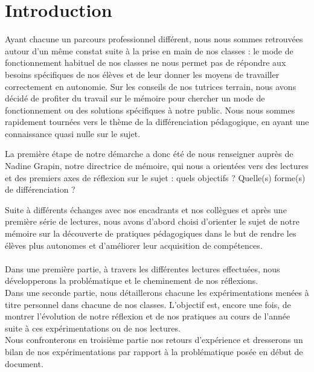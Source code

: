 \section{Introduction} %

Ayant chacune un parcours professionnel différent, nous nous sommes retrouvées autour d’un même constat suite à la prise en main de nos classes : le mode de fonctionnement habituel de nos classes ne nous permet pas de répondre aux besoins spécifiques de nos élèves et de leur donner les moyens de travailler correctement en autonomie. Sur les conseils de nos tutrices terrain, nous avons décidé de profiter du travail sur le mémoire pour chercher un mode de fonctionnement ou des solutions spécifiques à notre public. Nous nous sommes rapidement tournées vers le thème de la différenciation pédagogique, en ayant une connaissance quasi nulle sur le sujet.

La première étape de notre démarche a donc été de nous renseigner auprès de Nadine Grapin, notre directrice de mémoire, qui nous a orientées vers des lectures et des premiers axes de réflexion sur le sujet : quels objectifs ? Quelle(s) forme(s) de différenciation ?

Suite à différents échanges avec nos encadrants et nos collègues et après une première série de lectures, nous avons d'abord choisi d’orienter le sujet de notre mémoire sur la découverte de pratiques pédagogiques dans le but de rendre les élèves plus autonomes et d'améliorer leur acquisition de compétences.

\paragraph{}Dans une première partie, à travers les différentes lectures effectuées, nous développerons la problématique et le cheminement de nos réflexions. \\
Dans une seconde partie, nous détaillerons chacune les expérimentations menées à titre personnel dans chacune de nos classes. L'objectif est, encore une fois, de montrer l'évolution de notre réflexion et de nos pratiques au cours de l'année suite à ces expérimentations ou de nos lectures.\\
Nous confronterons en troisième partie nos retours d'expérience et dresserons un bilan de nos expérimentations par rapport à la problématique posée en début de document.

